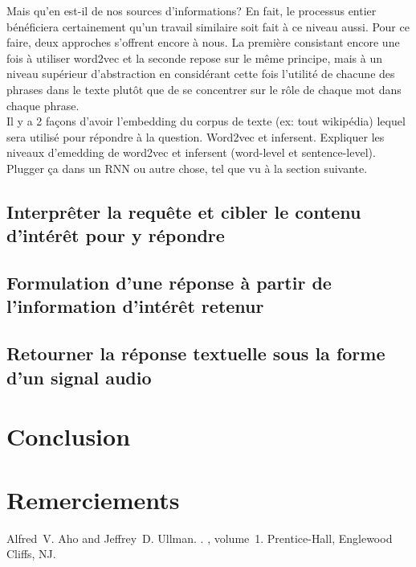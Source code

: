 \documentclass[11pt]{article}
\begin{document}
Mais qu'en est-il de nos sources d'informations? En fait, le processus entier bénéficiera certainement qu'un travail similaire soit fait à ce niveau aussi. Pour ce faire, deux approches s'offrent encore à nous. La première consistant encore une fois à utiliser word2vec et la seconde repose sur le même principe, mais à un niveau supérieur d'abstraction en considérant cette fois l'utilité de chacune des phrases dans le texte plutôt que de se concentrer sur le rôle de chaque mot dans chaque phrase.  \\

Il y a 2 façons d’avoir l’embedding du corpus de texte (ex: tout wikipédia) lequel sera utilisé pour répondre à la question. Word2vec et infersent. Expliquer les niveaux d’emedding de word2vec et infersent (word-level et sentence-level). Plugger ça dans un RNN ou autre chose, tel que vu à la section suivante.

\subsection{Interprêter la requête et cibler le contenu d'intérêt pour y répondre}

\subsection{Formulation d'une réponse à partir de l'information d'intérêt retenur}

\subsection{Retourner la réponse textuelle sous la forme d'un signal audio}

\section*{Conclusion}

\section*{Remerciements}

%
%

\begin{thebibliography}{}
Alfred~V. Aho and Jeffrey~D. Ullman.
.
, volume~1.
\newblock Prentice-{Hall}, Englewood Cliffs, NJ.

\end{thebibliography}
\end{document}
